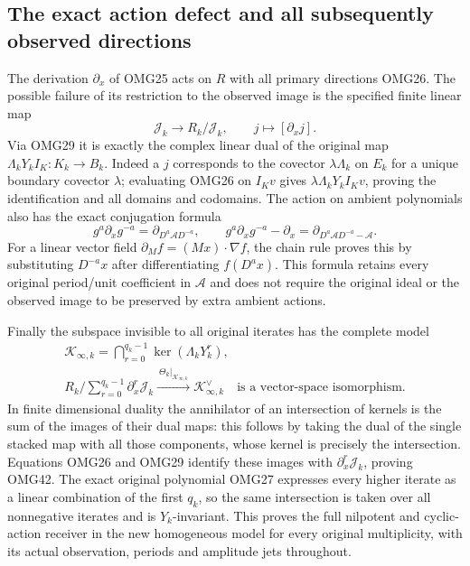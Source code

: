 \documentclass[11pt,a4paper]{article}
\begin{document}
\subsection{The exact action defect and all subsequently observed directions}
The derivation $\partial_x$ of OMG25 acts on $R$ with all primary
directions OMG26. The possible failure of its restriction to the
observed image is the specified finite linear map
\[
 \mathscr J_k\longrightarrow R_k/\mathscr J_k,
                       \qquad j\longmapsto[\partial_xj].
 \tag{OMG40}
\]
Via OMG29 it is exactly the complex linear dual of the original
map $\Lambda_kY_kI_K:K_k\to B_k$. Indeed a $j$ corresponds to
the covector $\lambda\Lambda_k$ on $E_k$ for a unique boundary
covector $\lambda$; evaluating OMG26 on $I_Kv$ gives
$\lambda\Lambda_kY_kI_Kv$, proving the identification and all
domains and codomains. The action on ambient polynomials also has
the exact conjugation formula
\[
 g^a\partial_xg^{-a}=\partial_{D^a\mathcal A D^{-a}},\qquad
 g^a\partial_xg^{-a}-\partial_x
                   =\partial_{D^a\mathcal A D^{-a}-\mathcal A}.
 \tag{OMG41}
\]
For a linear vector field $\partial_M f=(Mx)\cdot\nabla f$,
the chain rule proves this by substituting $D^{-a}x$ after
differentiating $f(D^a x)$. This formula retains every original
period/unit coefficient in $\mathcal A$ and does not require the
original ideal or the observed image to be preserved by extra
ambient actions.

Finally the subspace invisible to all original iterates has the
complete model
\[
\boxed{\begin{gathered}
 \mathcal K_{\infty,k}=\bigcap_{r=0}^{q_k-1}\ker(\Lambda_kY_k^r),\\
 R_k\Big/\sum_{r=0}^{q_k-1}\partial_x^r\mathscr J_k
       \xrightarrow{\ \Theta_k|_{\mathcal K_{\infty,k}}\ }
                          \mathcal K_{\infty,k}^\vee
                          \quad\text{is a vector-space isomorphism}.
\end{gathered}}\tag{OMG42}
\]
In finite dimensional duality the annihilator of an intersection
of kernels is the sum of the images of their dual maps: this
follows by taking the dual of the single stacked map with all
those components, whose kernel is precisely the intersection.
Equations OMG26 and OMG29 identify these images with
$\partial_x^r\mathscr J_k$, proving OMG42. The exact original
polynomial OMG27 expresses every higher iterate as a linear
combination of the first $q_k$, so the same intersection is taken
over all nonnegative iterates and is $Y_k$-invariant. This proves
the full nilpotent and cyclic-action receiver in the new homogeneous
model for every original multiplicity, with its actual observation,
periods and amplitude jets throughout.
\end{document}
